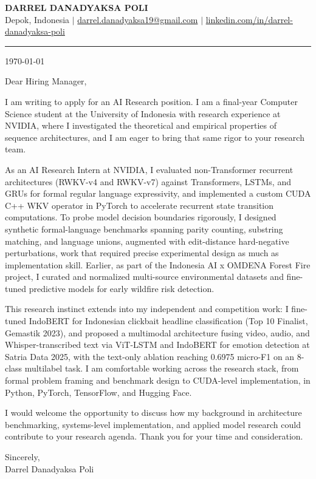 \documentclass[letterpaper,11pt]{article}
\begin{document}
\begin{center}
    {\LARGE \bfseries DARREL DANADYAKSA POLI} \\[3pt]
    \small Depok, Indonesia \quad $|$ \quad
    \href{mailto:darrel.danadyaksa19@gmail.com}{darrel.danadyaksa19@gmail.com} \quad $|$ \quad
    \href{https://www.linkedin.com/in/darrel-danadyaksa-poli/}{linkedin.com/in/darrel-danadyaksa-poli}
\end{center}
\vspace{2pt}
\hrule
\vspace{14pt}

\today

\vspace{8pt}

Dear Hiring Manager,

I am writing to apply for an AI Research position. I am a final-year Computer Science student at the University of Indonesia with research experience at NVIDIA, where I investigated the theoretical and empirical properties of sequence architectures, and I am eager to bring that same rigor to your research team.

As an AI Research Intern at NVIDIA, I evaluated non-Transformer recurrent architectures (RWKV-v4 and RWKV-v7) against Transformers, LSTMs, and GRUs for formal regular language expressivity, and implemented a custom CUDA C++ WKV operator in PyTorch to accelerate recurrent state transition computations. To probe model decision boundaries rigorously, I designed synthetic formal-language benchmarks spanning parity counting, substring matching, and language unions, augmented with edit-distance hard-negative perturbations, work that required precise experimental design as much as implementation skill. Earlier, as part of the Indonesia AI x OMDENA Forest Fire project, I curated and normalized multi-source environmental datasets and fine-tuned predictive models for early wildfire risk detection.

This research instinct extends into my independent and competition work: I fine-tuned IndoBERT for Indonesian clickbait headline classification (Top 10 Finalist, Gemastik 2023), and proposed a multimodal architecture fusing video, audio, and Whisper-transcribed text via ViT-LSTM and IndoBERT for emotion detection at Satria Data 2025, with the text-only ablation reaching 0.6975 micro-F1 on an 8-class multilabel task. I am comfortable working across the research stack, from formal problem framing and benchmark design to CUDA-level implementation, in Python, PyTorch, TensorFlow, and Hugging Face.

I would welcome the opportunity to discuss how my background in architecture benchmarking, systems-level implementation, and applied model research could contribute to your research agenda. Thank you for your time and consideration.

\vspace{10pt}

Sincerely, \\
Darrel Danadyaksa Poli
\end{document}
